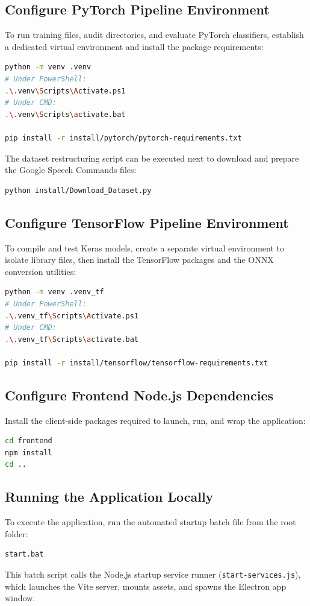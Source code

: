 \documentclass[11pt,a4paper]{article}
\begin{document}
\subsection{Configure PyTorch Pipeline Environment}
To run training files, audit directories, and evaluate PyTorch classifiers, establish a dedicated virtual environment and install the package requirements:
\begin{lstlisting}[language=bash]
python -m venv .venv
# Under PowerShell:
.\.venv\Scripts\Activate.ps1
# Under CMD:
.\.venv\Scripts\activate.bat

pip install -r install/pytorch/pytorch-requirements.txt
\end{lstlisting}
The dataset restructuring script can be executed next to download and prepare the Google Speech Commands files:
\begin{lstlisting}[language=bash]
python install/Download_Dataset.py
\end{lstlisting}

\subsection{Configure TensorFlow Pipeline Environment}
To compile and test Keras models, create a separate virtual environment to isolate library files, then install the TensorFlow packages and the ONNX conversion utilities:
\begin{lstlisting}[language=bash]
python -m venv .venv_tf
# Under PowerShell:
.\.venv_tf\Scripts\Activate.ps1
# Under CMD:
.\.venv_tf\Scripts\activate.bat

pip install -r install/tensorflow/tensorflow-requirements.txt
\end{lstlisting}

\subsection{Configure Frontend Node.js Dependencies}
Install the client-side packages required to launch, run, and wrap the application:
\begin{lstlisting}[language=bash]
cd frontend
npm install
cd ..
\end{lstlisting}

\subsection{Running the Application Locally}
To execute the application, run the automated startup batch file from the root folder:
\begin{lstlisting}[language=bash]
start.bat
\end{lstlisting}
This batch script calls the Node.js startup service runner (\texttt{start-services.js}), which launches the Vite server, mounts assets, and spawns the Electron app window.
\end{document}
